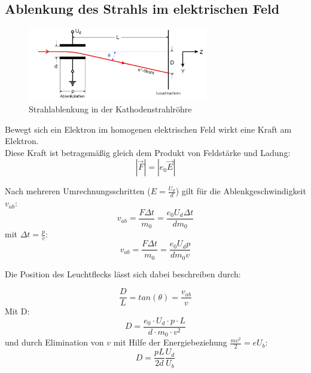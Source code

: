 \subsection{Ablenkung des Strahls im elektrischen Feld}
\begin{figure}[h]
  \centering
  \includegraphics[width=0.7\textwidth]{Grafiken/V501(2)_Abb1.jpg}
  \caption{Strahlablenkung in der Kathodenstrahlröhre \cite{V501}}
\end{figure}
Bewegt sich ein Elektron im homogenen elektrischen Feld wirkt eine Kraft am Elektron. \\
Diese Kraft ist betragsmäßig gleich dem Produkt von Feldstärke und
Ladung:
\begin{equation}
  \label{eq:force}
  |\vec{F}| = |e_0\vec{E}|
\end{equation}

Nach mehreren Umrechnungsschritten ($E = \frac{U_d}{d}$) gilt für die Ablenkgeschwindigkeit $v_{ab}$:
\begin{equation}
  v_{ab} = \frac{F\Delta t}{m_0} = \frac{e_0 U_d\Delta t}{d m_0}
\end{equation}
mit $\Delta t =\frac{p}{v}$:
\begin{equation}
	v_{ab} = \frac{F\Delta t}{m_0} = \frac{e_0 U_d p}{d m_0 v}
\end{equation}

Die Position des Leuchtflecks lässt sich dabei beschreiben durch:

\begin{equation}
	\frac{D}{L} = tan(\theta) =  \frac{v_{ab}}{v}
\end{equation}
Mit D:
\begin{equation}
	D = \frac{e_0\cdot U_d\cdot p\cdot L}{d\cdot m_0\cdot v^2}
\end{equation}
und durch Elimination von $v$ mit Hilfe der Energiebeziehung $\frac{m v^2}{2} = eU_{b}$:
\begin{equation}
	\label{eq:Theorie_D}
	D = \frac{p L}{2d}\frac{U_{d}}{U_{b}}
\end{equation}

